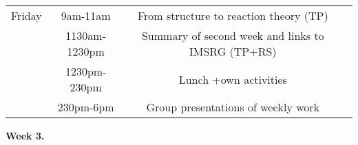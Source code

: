 \documentclass{beamer}
\begin{document}
\begin{frame}
\begin{block}{}
{\begin{tabular}{cccc}
\hline
Friday    & 9am-11am      & From structure to reaction theory (TP)            &                                               \\
          & 1130am-1230pm & Summary of second week and links to IMSRG (TP+RS) &                                               \\
          & 1230pm-230pm  & Lunch +own activities                             &                                               \\
          & 230pm-6pm     & Group presentations of weekly work                &                                               \\
\hline
\end{tabular}
}

\noindent


\noindent\textbf{Week 3.}


\end{block}
\end{frame}
\end{document}
